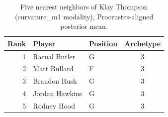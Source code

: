 \begin{table}[htbp]
  \centering\small
  \begin{tabular}{rllc}
    \toprule
    Rank & Player & Position & Archetype \\
    \midrule
    1 & Rasual Butler & G & 3 \\
    2 & Matt Bullard & F & 3 \\
    3 & Brandon Rush & G & 3 \\
    4 & Jordan Hawkins & G & 3 \\
    5 & Rodney Hood & G & 3 \\
    \bottomrule
  \end{tabular}
  \caption{Five nearest neighbors of Klay Thompson (curvature_m1 modality), Procrustes-aligned posterior mean.}
  \label{tab:Klay_Thompson_neighbors_curvature_m1}
\end{table}


